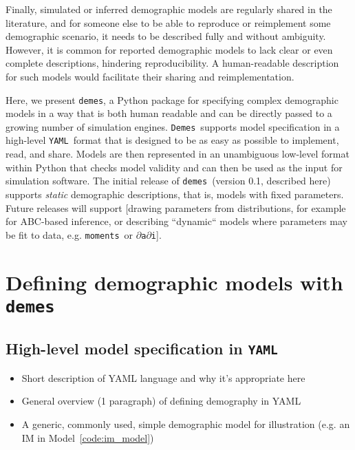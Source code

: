 \documentclass[11pt]{article}
\newenvironment{code}{\captionsetup{type=listing}\centering}{}
\newcommand{\demes}[0]{\texttt{demes}}
\newcommand{\Demes}[0]{\texttt{Demes}}
\newcommand{\YAML}[0]{\texttt{YAML}}
\newcommand{\moments}[0]{\texttt{moments}}
\newcommand{\dadi}[0]{\texttt{$\partial$a$\partial$i}}
\begin{document}
Finally, simulated or inferred demographic models are regularly shared in the
literature, and for someone else to be able to reproduce or reimplement some
demographic scenario, it needs to be described fully and without ambiguity.
However, it is common for reported demographic models to lack clear or even
complete descriptions, hindering reproducibility. A human-readable description
for such models would facilitate their sharing and reimplementation.

Here, we present \demes, a Python package for specifying complex demographic
models in a way that is both human readable and can be directly passed to a
growing number of simulation engines. \Demes\ supports model specification in a
high-level \YAML\ format \citep{ben2009yaml} that is designed to be as easy as
possible to implement, read, and share. Models are then represented in an
unambiguous low-level format within Python that checks model validity and can
then be used as the input for simulation software.  The initial release of
\demes\ (version 0.1, described here) supports \emph{static} demographic
descriptions, that is, models with fixed parameters. Future releases will
support [drawing parameters from distributions, for example for ABC-based
inference, or describing ``dynamic`` models where parameters may be fit to
data, e.g. \moments\ or \dadi].

\section*{Defining demographic models with \demes}

\subsection*{High-level model specification in \YAML}

\begin{itemize}
\item Short description of YAML language and why it's appropriate here
\item General overview (1 paragraph) of defining demography in YAML
\item A generic, commonly used, simple demographic model for illustration (e.g.
  an IM in Model~\ref{code:im_model})
\end{itemize}

\begin{code}
\begin{tcolorbox}
\inputminted[linenos,numbersep=5pt]{yaml}{models/IM.yaml}
\end{tcolorbox}
\label{code:im_model}
\end{code}
\end{document}
